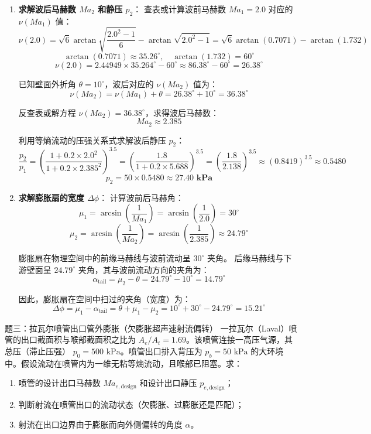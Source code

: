\documentclass[11pt,a4paper]{ctexart}
\begin{document}
\begin{enumerate}
    \item \textbf{求解波后马赫数 $Ma_2$ 和静压 $p_2$}：
    查表或计算波前马赫数 $Ma_1 = 2.0$ 对应的 $\nu(Ma_1)$ 值：
    \[
    \nu(2.0) = \sqrt{6} \arctan \sqrt{\frac{2.0^2 - 1}{6}} - \arctan \sqrt{2.0^2 - 1} = \sqrt{6} \arctan(0.7071) - \arctan(1.732)
    \]
    \[
    \arctan(0.7071) \approx 35.26^\circ, \quad \arctan(1.732) = 60^\circ
    \]
    \[
    \nu(2.0) = 2.44949 \times 35.264^\circ - 60^\circ \approx 86.38^\circ - 60^\circ = 26.38^\circ
    \]
    
    已知壁面外折角 $\theta = 10^\circ$，波后对应的 $\nu(Ma_2)$ 值为：
    \[
    \nu(Ma_2) = \nu(Ma_1) + \theta = 26.38^\circ + 10^\circ = 36.38^\circ
    \]
    
    反查表或解方程 $\nu(Ma_2) = 36.38^\circ$，求得波后马赫数：
    \[
    Ma_2 \approx 2.385
    \]
    
    利用等熵流动的压强关系式求解波后静压 $p_2$：
    \[
    \frac{p_2}{p_1} = \left(\frac{1 + 0.2 \times 2.0^2}{1 + 0.2 \times 2.385^2}\right)^{3.5} = \left(\frac{1.8}{1 + 0.2 \times 5.688}\right)^{3.5} = \left(\frac{1.8}{2.138}\right)^{3.5} \approx (0.8419)^{3.5} \approx 0.5480
    \]
    \[
    p_2 = 50 \times 0.5480 \approx \mathbf{27.40\text{ kPa}}
    \]

    \item \textbf{求解膨胀扇的宽度 $\Delta \phi$}：
    计算波前后马赫角：
    \[
    \mu_1 = \arcsin\left(\frac{1}{Ma_1}\right) = \arcsin\left(\frac{1}{2.0}\right) = 30^\circ
    \]
    \[
    \mu_2 = \arcsin\left(\frac{1}{Ma_2}\right) = \arcsin\left(\frac{1}{2.385}\right) \approx 24.79^\circ
    \]
    
    膨胀扇在物理空间中的前缘马赫线与波前流动呈 $30^\circ$ 夹角。
    后缘马赫线与下游壁面呈 $24.79^\circ$ 夹角，其与波前流动方向的夹角为：
    \[
    \alpha_{\text{tail}} = \mu_2 - \theta = 24.79^\circ - 10^\circ = 14.79^\circ
    \]
    
    因此，膨胀扇在空间中扫过的夹角（宽度）为：
    \[
    \Delta \phi = \mu_1 - \alpha_{\text{tail}} = \theta + \mu_1 - \mu_2 = 10^\circ + 30^\circ - 24.79^\circ = \mathbf{15.21^\circ}
    \]
\end{enumerate}

\newpage

\begin{questionbox}{题三：拉瓦尔喷管出口管外膨胀（欠膨胀超声速射流偏转）}
一拉瓦尔（Laval）喷管的出口截面积与喉部截面积之比为 $A_e/A_t = 1.69$。该喷管连接一高压气源，其总压（滞止压强） $p_0 = 500\text{ kPa}$。喷管出口排入背压为 $p_b = 50\text{ kPa}$ 的大环境中。假设流动在喷管内为一维无粘等熵流动，且喉部已阻塞。求：
\begin{enumerate}
    \item 喷管的设计出口马赫数 $Ma_{e,\text{design}}$ 和设计出口静压 $p_{e,\text{design}}$；
    \item 判断射流在喷管出口的流动状态（欠膨胀、过膨胀还是匹配）；
    \item 射流在出口边界由于膨胀而向外侧偏转的角度 $\alpha$。
\end{enumerate}
\end{questionbox}
\end{document}
